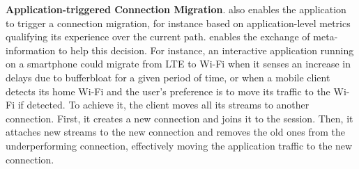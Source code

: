 \textbf{Application-triggered Connection Migration}. \tcpls also enables the
application to trigger a connection migration, for instance based on application-level metrics qualifying its experience over the current path.
\tcpls enables the exchange of meta-information to help this
decision.
For instance, an interactive application running on a smartphone could migrate 
from
LTE to Wi-Fi when it senses an increase in delays due to bufferbloat for a
given period of time, or when a mobile client detects its home Wi-Fi and the
user's preference is to move its traffic to the Wi-Fi if detected.
To achieve it, the client moves all its \tcpls streams to another \tcp
connection.
First, it creates a new \tcp connection and joins it to the
\tcpls
session. Then, %
it attaches new streams to the new
connection
and removes the old ones from the underperforming connection, effectively moving
the application traffic to the new connection.

